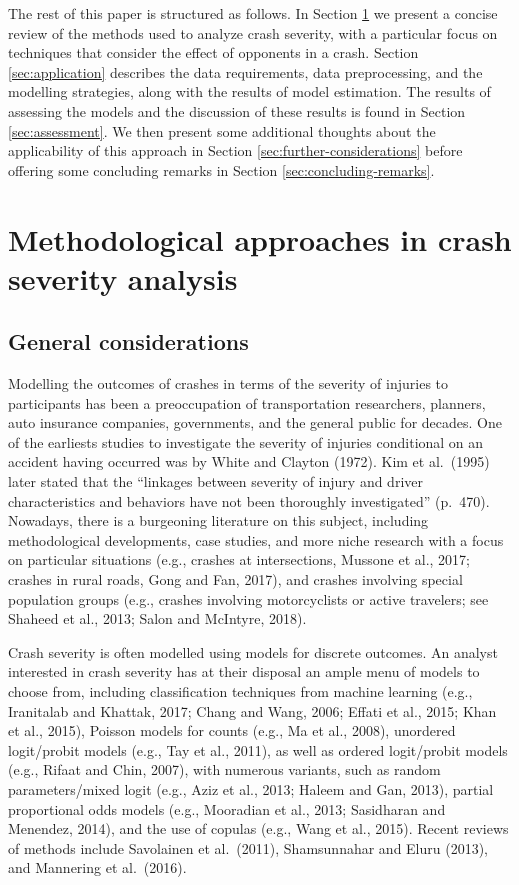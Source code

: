 \documentclass[]{elsarticle} %
\begin{document}
The rest of this paper is structured as follows. In Section
\ref{sec:review-of-methods} we present a concise review of the methods
used to analyze crash severity, with a particular focus on techniques
that consider the effect of opponents in a crash. Section
\ref{sec:application} describes the data requirements, data
preprocessing, and the modelling strategies, along with the results of
model estimation. The results of assessing the models and the discussion
of these results is found in Section \ref{sec:assessment}. We then
present some additional thoughts about the applicability of this
approach in Section \ref{sec:further-considerations} before offering
some concluding remarks in Section \ref{sec:concluding-remarks}.

\hypertarget{sec:review-of-methods}{%
\section{Methodological approaches in crash severity
analysis}\label{sec:review-of-methods}}

\hypertarget{sec:general-considerations}{%
\subsection{General considerations}\label{sec:general-considerations}}

Modelling the outcomes of crashes in terms of the severity of injuries
to participants has been a preoccupation of transportation researchers,
planners, auto insurance companies, governments, and the general public
for decades. One of the earliests studies to investigate the severity of
injuries conditional on an accident having occurred was by White and
Clayton (1972). Kim et al.~(1995) later stated that the ``linkages
between severity of injury and driver characteristics and behaviors have
not been thoroughly investigated'' (p.~470). Nowadays, there is a
burgeoning literature on this subject, including methodological
developments, case studies, and more niche research with a focus on
particular situations (e.g., crashes at intersections, Mussone et al.,
2017; crashes in rural roads, Gong and Fan, 2017), and crashes involving
special population groups (e.g., crashes involving motorcyclists or
active travelers; see Shaheed et al., 2013; Salon and McIntyre, 2018).

Crash severity is often modelled using models for discrete outcomes. An
analyst interested in crash severity has at their disposal an ample menu
of models to choose from, including classification techniques from
machine learning (e.g., Iranitalab and Khattak, 2017; Chang and Wang,
2006; Effati et al., 2015; Khan et al., 2015), Poisson models for counts
(e.g., Ma et al., 2008), unordered logit/probit models (e.g., Tay et
al., 2011), as well as ordered logit/probit models (e.g., Rifaat and
Chin, 2007), with numerous variants, such as random parameters/mixed
logit (e.g., Aziz et al., 2013; Haleem and Gan, 2013), partial
proportional odds models (e.g., Mooradian et al., 2013; Sasidharan and
Menendez, 2014), and the use of copulas (e.g., Wang et al., 2015).
Recent reviews of methods include Savolainen et al.~(2011), Shamsunnahar
and Eluru (2013), and Mannering et al.~(2016).
\end{document}

